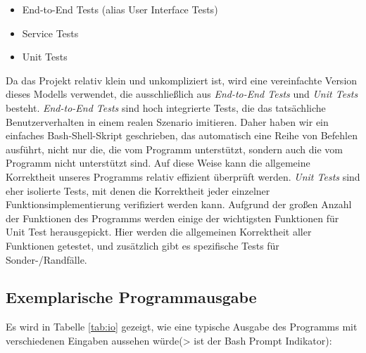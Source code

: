 \documentclass[course=erap]{aspdoc}
\begin{document}
\begin{itemize}
    \item End-to-End Tests (alias User Interface Tests)
    \item Service Tests
    \item Unit Tests
\end{itemize}
    
Da das Projekt relativ klein und unkompliziert ist, wird eine vereinfachte Version dieses Modells verwendet, die ausschließlich aus \textit{End-to-End Tests} und \textit{Unit Tests} besteht. \textit{End-to-End Tests} sind hoch integrierte Tests, die das tatsächliche Benutzerverhalten in einem realen Szenario imitieren. Daher haben wir ein einfaches Bash-Shell-Skript geschrieben, das automatisch eine Reihe von Befehlen ausführt, nicht nur die, die vom Programm unterstützt, sondern auch die vom Programm nicht unterstützt sind. Auf diese Weise kann die allgemeine Korrektheit unseres Programms relativ effizient überprüft werden. \textit{Unit Tests} sind eher isolierte Tests, mit denen die Korrektheit jeder einzelner Funktionsimplementierung verifiziert werden kann. Aufgrund der großen Anzahl der Funktionen des Programms werden einige der wichtigsten Funktionen für Unit Test herausgepickt. Hier werden die allgemeinen Korrektheit aller Funktionen getestet, und zusätzlich gibt es spezifische Tests für Sonder-/Randfälle.

\subsection{Exemplarische Programmausgabe}
Es wird in Tabelle \ref{tab:io} gezeigt, wie eine typische Ausgabe des Programms mit verschiedenen Eingaben aussehen würde(> ist der Bash Prompt Indikator):
\end{document}
